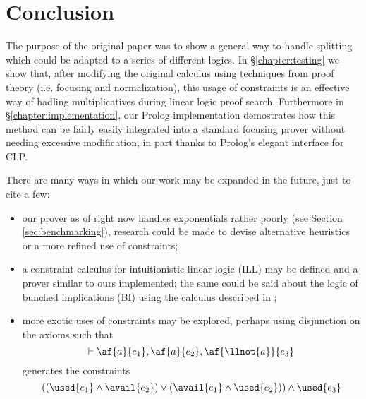 \chapter{Conclusion}\label{chapter:conclusion}
The purpose of the original paper \cite{HarlandPym} was to show a general way to handle splitting which could be adapted to a series of different logics.
In \S\ref{chapter:testing} we show that, after modifying the original calculus using techniques from proof theory (i.e. focusing \cite{Focusing} and normalization), this usage of constraints is an effective way of hadling multiplicatives during linear logic proof search.
Furthermore in \S\ref{chapter:implementation}, our Prolog implementation demostrates how this method can be fairly easily integrated into a standard focusing prover without needing excessive modification, in part thanks to Prolog's elegant interface for CLP.

There are many ways in which our work may be expanded in the future, just to cite a few:
\begin{itemize}
	\item our prover as of right now handles exponentials rather poorly (see Section \ref{sec:benchmarking}), research could be made to devise alternative heuristics or a more refined use of constraints;
	\item a constraint calculus for intuitionistic linear logic (ILL) may be defined and a prover similar to ours implemented; the same could be said about the logic of bunched implications (BI) using the calculus described in \cite{HarlandPym};
	\item more exotic uses of constraints may be explored, perhaps using disjunction on the axioms such that
		$$ \vdash \af{a}{e_1}, \af{a}{e_2}, \af{\llnot{a}}{e_3} $$
	generates the constraints
		$$ ((\used{e_1} \wedge \avail{e_2}) \vee (\avail{e_1} \wedge \used{e_2})) \wedge \used{e_3} $$
\end{itemize}
